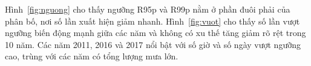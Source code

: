 

Hình~\ref{fig:nguong} cho thấy ngưỡng R95p và R99p nằm ở phần đuôi phải của phân bố, nơi số lần xuất hiện giảm nhanh. Hình~\ref{fig:vuot} cho thấy số lần vượt ngưỡng biến động mạnh giữa các năm và không có xu thế tăng giảm rõ rệt trong 10 năm. Các năm 2011, 2016 và 2017 nổi bật với số giờ và số ngày vượt ngưỡng cao, trùng với các năm có tổng lượng mưa lớn.

